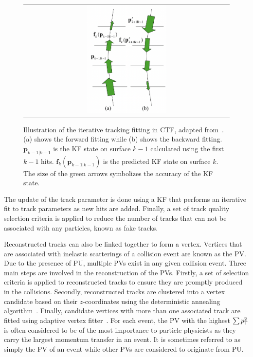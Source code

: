 \begin{figure}[tbh!]
 \begin{center}
 \begin{tabular}{c}
 \includegraphics[width=0.4\textwidth]{figures/Part2/Event/CTF}
 \end{tabular}
 \caption{Illustration of the iterative tracking fitting in \ac{CTF}, adapted from~\cite{Lenzi:2008zza}. (a) shows the forward fitting while (b) shows the backward fitting. $\textbf{p}_{k-1|k-1}$ is the \ac{KF} state on surface $k-1$ calculated using the first $k-1$ hits. $\textbf{f}_{k}(\textbf{p}_{k-1|k-1})$ is the predicted \ac{KF} state on surface $k$. The size of the green arrows symbolizes the accuracy of the \ac{KF} state.}
 \label{fig:CTF}
 \end{center}
\end{figure}

The update of the track parameter is done using a \ac{KF} that performs an iterative fit to track parameters as new hits are added. Finally, a set of track quality selection criteria is applied to reduce the number of tracks that can not be associated with any particles, known as fake tracks. 

Reconstructed tracks can also be linked together to form a vertex. Vertices that are associated with inelastic scatterings of a collision event are known as the \ac{PV}. Due to the presence of \ac{PU}, multiple \acp{PV} exist in any given collision event. Three main steps are involved in the reconstruction of the \acp{PV}. Firstly, a set of selection criteria is applied to reconstructed tracks to ensure they are promptly produced in the collisions. Secondly, reconstructed tracks are clustered into a vertex candidate based on their $z$-coordinates using the deterministic annealing algorithm~\cite{Rose:1998dzq}. Finally, candidate vertices with more than one associated track are fitted using adaptive vertex fitter~\cite{Fruhwirth:2007hz}. For each event, the \ac{PV} with the highest $\sum p_{\textsf{T}}^2$ is often considered to be of the most importance to particle physicists as they carry the largest momentum transfer in an event. It is sometimes referred to as simply the \ac{PV} of an event while other \acp{PV} are considered to originate from \ac{PU}.

